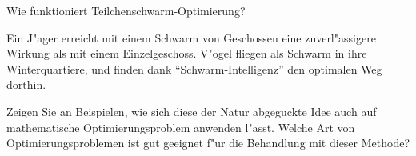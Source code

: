 \begin{aufgabe}
Wie funktioniert Teilchenschwarm-Optimierung?
\end{aufgabe}

{\parindent 0pt Ein J"ager erreicht mit einem Schwarm}
von Geschossen eine zuverl"assigere
Wirkung als mit einem Einzelgeschoss. V"ogel fliegen als Schwarm in ihre
Winterquartiere, und finden dank ``Schwarm-Intelligenz'' den optimalen
Weg dorthin.

Zeigen Sie an Beispielen, wie sich diese der Natur abgeguckte Idee auch
auf mathematische Optimierungsproblem anwenden l"asst. Welche Art von
Optimierungsproblemen ist gut geeignet f"ur die Behandlung mit dieser
Methode?
